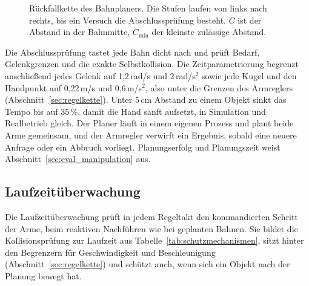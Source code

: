 \begin{figure}[htbp]
  \centering
  
  \caption[Rückfallkette des Bahnplaners]{Rückfallkette des Bahnplaners. Die Stufen laufen von links nach rechts, bis ein Versuch die Abschlussprüfung besteht. $C$ ist der Abstand in der Bahnmitte, $C_\mathrm{min}$ der kleinste zulässige Abstand.}
  \label{fig:rueckfallkette}
\end{figure}

Die Abschlussprüfung tastet jede Bahn dicht nach und prüft Bedarf, Gelenkgrenzen und die exakte Selbstkollision.
Die Zeitparametrierung begrenzt anschließend jedes Gelenk auf 1,2\,rad/s und 2\,rad/s$^2$ sowie jede Kugel und den Handpunkt auf 0,22\,m/s und 0,6\,m/s$^2$, also unter die Grenzen des Armreglers (Abschnitt~\ref{sec:regelkette}).
Unter 5\,cm Abstand zu einem Objekt sinkt das Tempo bis auf 35\,\%, damit die Hand sanft aufsetzt, in Simulation und Realbetrieb gleich.
Der Planer läuft in einem eigenen Prozess und plant beide Arme gemeinsam, und der Armregler verwirft ein Ergebnis, sobald eine neuere Anfrage oder ein Abbruch vorliegt.
Planungserfolg und Planungszeit weist Abschnitt~\ref{sec:eval_manipulation} aus.

\subsection{Laufzeitüberwachung}
\label{sec:laufzeitueberwachung}

Die Laufzeitüberwachung prüft in jedem Regeltakt den kommandierten Schritt der Arme, beim reaktiven Nachführen wie bei geplanten Bahnen.
Sie bildet die Kollisionsprüfung zur Laufzeit aus Tabelle~\ref{tab:schutzmechanismen}, sitzt hinter den Begrenzern für Geschwindigkeit und Beschleunigung (Abschnitt~\ref{sec:regelkette}) und schützt auch, wenn sich ein Objekt nach der Planung bewegt hat.

